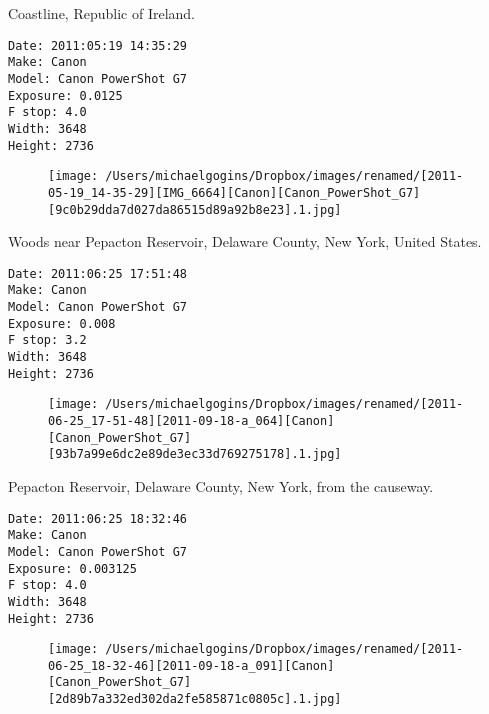 \documentclass[11pt,letter,DIV=14,paper=landscape]{scrbook}
\begin{document}
\clearpage
\noindent Coastline, Republic of Ireland.
\noindent
\begin{lstlisting}
Date: 2011:05:19 14:35:29
Make: Canon
Model: Canon PowerShot G7
Exposure: 0.0125
F stop: 4.0
Width: 3648
Height: 2736
\end{lstlisting}
\clearpage

\begin{figure}
\texttt{[image: /Users/michaelgogins/Dropbox/images/renamed/[2011-05-19\_14-35-29][IMG\_6664][Canon][Canon\_PowerShot\_G7][9c0b29dda7d027da86515d89a92b8e23].1.jpg]}
\end{figure}
    
\clearpage
\noindent Woods near Pepacton Reservoir, Delaware County, New York, United States.
\noindent
\begin{lstlisting}
Date: 2011:06:25 17:51:48
Make: Canon
Model: Canon PowerShot G7
Exposure: 0.008
F stop: 3.2
Width: 3648
Height: 2736
\end{lstlisting}
\clearpage

\begin{figure}
\texttt{[image: /Users/michaelgogins/Dropbox/images/renamed/[2011-06-25\_17-51-48][2011-09-18-a\_064][Canon][Canon\_PowerShot\_G7][93b7a99e6dc2e89de3ec33d769275178].1.jpg]}
\end{figure}
    
\clearpage
\noindent Pepacton Reservoir, Delaware County, New York, from the causeway.
\noindent
\begin{lstlisting}
Date: 2011:06:25 18:32:46
Make: Canon
Model: Canon PowerShot G7
Exposure: 0.003125
F stop: 4.0
Width: 3648
Height: 2736
\end{lstlisting}
\clearpage

\begin{figure}
\texttt{[image: /Users/michaelgogins/Dropbox/images/renamed/[2011-06-25\_18-32-46][2011-09-18-a\_091][Canon][Canon\_PowerShot\_G7][2d89b7a332ed302da2fe585871c0805c].1.jpg]}
\end{figure}
    
\end{document}
